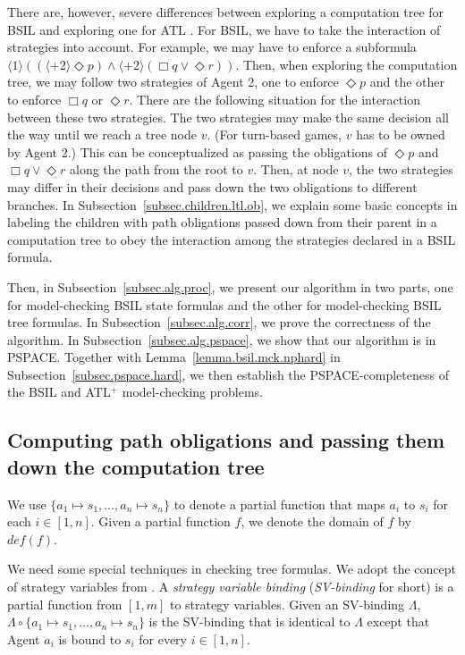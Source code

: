 \documentclass[11pt]{article}
\newcommand{\emdef}{\textit{def}}
\newcommand{\pfrr}{\Box}
\newcommand{\pevt}{\Diamond}
\begin{document}
There are, however, severe differences between exploring 
a computation tree for 
BSIL and exploring one for ATL \cite{AHK02}.   
For BSIL, we have to take the interaction of strategies into account.  
For example, we may have to enforce a subformula 
$\langle 1\rangle((\langle+ 2\rangle \pevt p)
\wedge\langle+ 2\rangle (\pfrr q\vee \pevt r))$.  
Then, when exploring the computation tree, 
we may follow two strategies of Agent 2, one to enforce $\pevt p$ and 
the other to enforce $\pfrr q$ or $\pevt r$.  
There are the following situation for the 
interaction between these two strategies. 
The two strategies may make the same decision all the way 
until we reach a tree node $v$.  
(For turn-based games, $v$ has to be owned by Agent 2.)    
This can be conceptualized as passing the obligations of $\pevt p$ and 
$\pfrr q\vee\pevt r$ along the path from the root to $v$.  
Then, at node $v$, the two strategies may differ in their decisions 
and pass down the two obligations to different branches. 
In Subsection~\ref{subsec.children.ltl.ob},
we explain some basic concepts in labeling the children with
path obligations passed down from their parent in a computation tree
to obey the interaction among the strategies declared in a BSIL formula.

Then, in Subsection~\ref{subsec.alg.proc},
we present our algorithm in two parts,
one for model-checking BSIL state formulas
and the other for model-checking BSIL tree formulas.
In Subsection~\ref{subsec.alg.corr},
we prove the correctness of the algorithm.
In Subsection~\ref{subsec.alg.pspace}, 
we show that our algorithm is in PSPACE.  
Together with Lemma~\ref{lemma.bsil.mck.nphard} in 
Subsection~\ref{subsec.pspace.hard}, 
we then establish the PSPACE-completeness of 
the BSIL and ATL$^+$ model-checking problems.  



\subsection{Computing path obligations and passing them down the computation tree
\label{subsec.children.ltl.ob}
}

We use $\{a_1 \mapsto s_1,\ldots,a_n\mapsto s_n\}$ to denote 
a partial function that maps $a_i$ to $s_i$ for each $i\in[1,n]$.  
Given a partial function $f$, 
we denote the domain of $f$ by $\emdef(f)$.

We need some special techniques in checking tree formulas.  
We adopt the concept of strategy variables from \cite{CHP10,MMV10}. 
A {\em strategy variable binding} ({\em SV-binding} for short) 
is a partial function from $[1,m]$ to strategy variables.  
Given an SV-binding $\Lambda$, 
$\Lambda\circ\{a_1 \mapsto s_1,\ldots,a_n\mapsto s_n\}$ 
is the SV-binding that is identical to $\Lambda$ 
except that Agent $a_i$ is bound to $s_i$ for every $i\in[1,n]$.  
\end{document}
